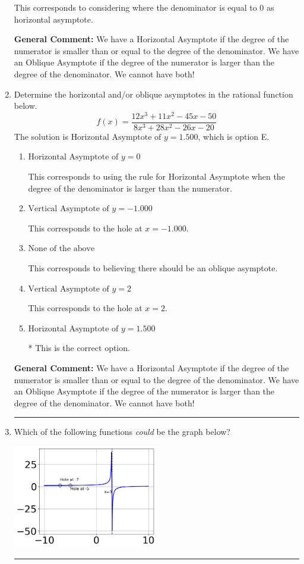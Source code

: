 \documentclass{extbook}[14pt]
\newcommand{\litem}[1]{\item #1

\rule{\textwidth}{0.4pt}}
\begin{document}
\begin{enumerate}
{\begin{enumerate}[label=\Alph*.]
This corresponds to considering where the denominator is equal to 0 as horizontal asymptote.
\end{enumerate}

\textbf{General Comment:} We have a Horizontal Asymptote if the degree of the numerator is smaller than or equal to the degree of the denominator. We have an Oblique Asymptote if the degree of the numerator is larger than the degree of the denominator. We cannot have both!
}
\litem{
Determine the horizontal and/or oblique asymptotes in the rational function below.
\[ f(x) = \frac{12x^{3} +11 x^{2} -45 x -50}{8x^{3} +28 x^{2} -26 x -20} \]The solution is \( \text{Horizontal Asymptote of } y = 1.500  \), which is option E.\begin{enumerate}[label=\Alph*.]
\item \( \text{Horizontal Asymptote of } y = 0  \)

This corresponds to using the rule for Horizontal Asymptote when the degree of the denominator is larger than the numerator.
\item \( \text{Vertical Asymptote of } y = -1.000  \)

This corresponds to the hole at $x = -1.000$.
\item \( \text{None of the above} \)

This corresponds to believing there should be an oblique asymptote.
\item \( \text{Vertical Asymptote of } y = 2  \)

This corresponds to the hole at $x = 2$.
\item \( \text{Horizontal Asymptote of } y = 1.500  \)

* This is the correct option.
\end{enumerate}

\textbf{General Comment:} We have a Horizontal Asymptote if the degree of the numerator is smaller than or equal to the degree of the denominator. We have an Oblique Asymptote if the degree of the numerator is larger than the degree of the denominator. We cannot have both!
}
\litem{
Which of the following functions \textit{could} be the graph below?

\begin{center}
    \includegraphics[width=0.5\textwidth]{../Figures/identifyGraphOfRationalFunctionCopyA.png}
\end{center}


}
\end{enumerate}
\end{document}
